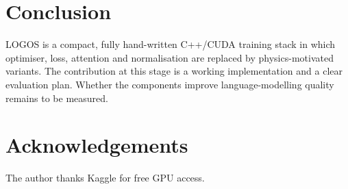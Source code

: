 \documentclass[11pt,a4paper]{article}
\newcommand{\LOGOS}{\textsc{LOGOS}}
\begin{document}
\section{Conclusion}
\label{sec:conclusion}

\LOGOS{} is a compact, fully hand-written C++/CUDA training stack in
which optimiser, loss, attention and normalisation are replaced by
physics-motivated variants. The contribution at this stage is a working
implementation and a clear evaluation plan. Whether the components
improve language-modelling quality remains to be measured.

\section*{Acknowledgements}
The author thanks Kaggle for free GPU access.
\end{document}
